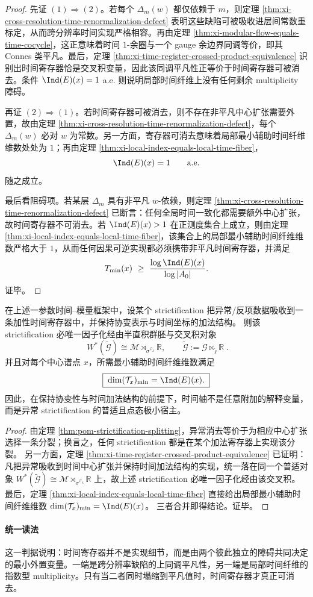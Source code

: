 \begin{proof}
先证 \((1)\Rightarrow(2)\)。若每个 \(\Delta_m(w)\) 都仅依赖于 \(m\)，则定理 \ref{thm:xi-cross-resolution-time-renormalization-defect} 表明这些缺陷可被吸收进层间常数重标定，从而跨分辨率时间实现严格相容。再由定理 \ref{thm:xi-modular-flow-equals-time-cocycle}，这正意味着时间 \(1\)-余圈与一个 gauge 余边界同调等价，即其 Connes 类平凡。最后，定理 \ref{thm:xi-time-register-crossed-product-equivalence} 识别出时间寄存器恰是交叉积变量，因此该同调平凡性正等价于时间寄存器可被消去。条件 \(\Ind(E)(x)=1\) a.e. 则说明局部时间纤维上没有任何剩余 multiplicity 障碍。

再证 \((2)\Rightarrow(1)\)。若时间寄存器可被消去，则不存在非平凡中心扩张需要外置，故由定理 \ref{thm:xi-cross-resolution-time-renormalization-defect}，每个 \(\Delta_m(w)\) 必对 \(w\) 为常数。另一方面，寄存器可消去意味着局部最小辅助时间纤维维数处处为 \(1\)；再由定理 \ref{thm:xi-local-index-equals-local-time-fiber}，
\[
\Ind(E)(x)=1
\qquad\text{a.e.}
\]
随之成立。

最后看阻碍项。若某层 \(\Delta_m\) 具有非平凡 \(w\)-依赖，则定理 \ref{thm:xi-cross-resolution-time-renormalization-defect} 已断言：任何全局时间一致化都需要额外中心扩张，故时间寄存器不可消去。若 \(\Ind(E)(x)>1\) 在正测度集合上成立，则由定理 \ref{thm:xi-local-index-equals-local-time-fiber}，该集合上的局部最小辅助时间纤维维数严格大于 \(1\)，从而任何因果可逆实现都必须携带非平凡时间寄存器，并满足
\[
T_{\min}(x)\ \ge\ \frac{\log \Ind(E)(x)}{\log |A_0|}.
\]
证毕。
\end{proof}

\begin{theorem}\label{thm:conclusion-anomaly-strictification-universal-time-host}
在上述一参数时间--模量框架中，设某个 strictification 把异常/反项数据吸收到一条加性时间寄存器中，并保持协变表示与时间坐标的加法结构。
则该 strictification 必唯一因子化经由半直积群胚与交叉积对象
\[
\boxed{\;
W^\ast(\widetilde{\mathcal G})
\cong
\mathcal M\rtimes_{\sigma^{\varphi_\lambda}}\mathbb R,\qquad
\widetilde{\mathcal G}:=\mathcal G\ltimes_{\widetilde\ell}\mathbb R\; }.
\]
并且对每个中心谱点 \(x\)，所需最小辅助时间纤维维数满足
\[
\boxed{\;
\dim(\mathcal T_x)_{\min}=\Ind(E)(x).\;}
\]
因此，在保持协变性与时间加法结构的前提下，时间轴不是任意附加的解释变量，而是异常 strictification 的普适且点态极小宿主。
\end{theorem}
\begin{proof}
由定理 \ref{thm:pom-strictification-splitting}，异常消去等价于为相应中心扩张选择一条分裂；换言之，任何 strictification 都是在某个加法寄存器上实现该分裂。
另一方面，定理 \ref{thm:xi-time-register-crossed-product-equivalence} 已证明：凡把异常吸收到时间中心扩张并保持时间加法结构的实现，统一落在同一个普适对象
\(
W^\ast(\widetilde{\mathcal G})\cong \mathcal M\rtimes_{\sigma^{\varphi_\lambda}}\mathbb R
\)
上，故上述 strictification 必唯一因子化经由该交叉积。
最后，定理 \ref{thm:xi-local-index-equals-local-time-fiber} 直接给出局部最小辅助时间纤维维数
\(
\dim(\mathcal T_x)_{\min}=\Ind(E)(x)
\)。
三者合并即得结论。证毕。
\end{proof}

\paragraph{统一读法}
这一判据说明：时间寄存器并不是实现细节，而是由两个彼此独立的障碍共同决定的最小外置变量。一端是跨分辨率缺陷的上同调平凡性，另一端是局部时间纤维的指数型 multiplicity。只有当二者同时塌缩到平凡值时，时间寄存器才真正可消去。

\endinput
